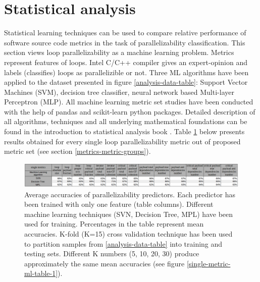 \section{Statistical analysis}
\label{analysis-statistical-analysis}
\qquad Statistical learning techniques can be used to compare relative performance of software source code metrics in the task of parallelizability classification. This section views loop parallelizability as a machine learning problem. Metrics represent features of loops. Intel C/C++ compiler gives an expert-opinion and labels (classifies) loops as parallelizible or not. Three ML algorithms have been applied to the dataset presented in figure \ref{analysis-data-table}: Support Vector Machines (SVM), decision tree classifier, neural network based Multi-layer Perceptron (MLP). All machine learning metric set studies have been conducted with the help of pandas \cite{python-lib-pandas} and scikit-learn \cite{python-lib-scikit-learn} python packages. Detailed description of all algorithms, techniques and all underlying mathematical foundations can be found in the introduction to statistical analysis book \cite{statistical-learning-book}.\newline
\null\qquad Table \ref{single-metric-ml-table-0} below presents results obtained for every single loop parallelizability metric out of proposed metric set (see section \ref{metrics-metric-groups}).
\begin{figure}[htb]
\centering
\includegraphics[width=\linewidth]{figs/single-metric-ml-table-0.png}
\caption{Average accuracies of parallelizability predictors. Each predictor has been trained with only one feature (table columns). Different machine learning techniques (SVN, Decision Tree, MPL) have been used for training. Percentages in the table represent mean accuracies. K-fold (K=15) cross validation technique has been used to partition samples from \ref{analysis-data-table} into training and testing sets. Different K numbers (5, 10, 20, 30) produce approximately the same mean accuracies (see figure \ref{single-metric-ml-table-1}).}
\label{single-metric-ml-table-0}
\end{figure}\newline 
